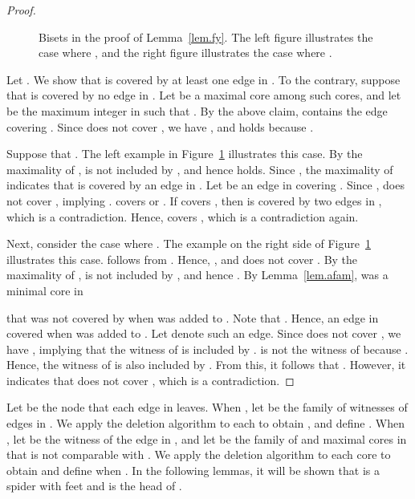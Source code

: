 \documentclass[11pt]{article}
\begin{document}
\begin{proof}
\begin{figure}[t]
 \caption{Bisets in the proof of Lemma~\ref{lem.fy}. The left figure
illustrates the case where , and the right figure illustrates the
 case where .}
 \label{fig.lemmafy}
\end{figure}

 Let .
 We show that  is covered by at least one edge in .
  To the contrary,
 suppose that   is 
 covered by no edge in .
 Let  be a maximal core among such cores,
 and let  be the maximum integer in  such that 
 .
 By the above claim,  contains the edge
  covering .
 Since  does not cover , we have , and
  holds because .

 Suppose that .
 The left example in Figure~\ref{fig.lemmafy}
 illustrates this case.
 By the maximality of , 
  is not included by , and hence
  holds.
 Since ,
 the maximality of  indicates that
  is covered by an edge in .
 Let
  be an edge in  covering .
 Since ,  does not cover
 , implying .
  covers  or .
 If  covers , then
  is covered by two edges in , which is a contradiction.
 Hence,  covers , which is a contradiction again.

 Next, consider the case where .
 The example on the right side of Figure~\ref{fig.lemmafy} illustrates this case.
  follows from .
 Hence, , and  does not cover
 .
 By the maximality of ,  is not included by ,
 and hence .
 By Lemma~\ref{lem.afam},  was a minimal core in
 
 that was not covered by  when  was added to .
 Note that .
 Hence, an edge in  covered 
 when  was added to .
 Let  denote such an edge.
 Since  does not cover ,
 we have , implying that the witness of  is
 included by .
  is not the witness of  because .
 Hence, the witness of  is also included by .
 From this, it follows that .
 However, it indicates that  does not cover ,
 which is a contradiction.
 \end{proof}


Let  be the node that each edge in  leaves.
When , 
let  be the family of witnesses of edges in .
We apply the deletion algorithm to each
 to obtain , and define .
When ,
let  be the witness of the edge in ,
and let  be the family of  and maximal cores in
 that is not comparable with .
We apply the deletion algorithm to each core  to
obtain  and define 
when .
In the following lemmas, it will be shown that  is a spider with 
 feet and  is the head of .
\end{document}
